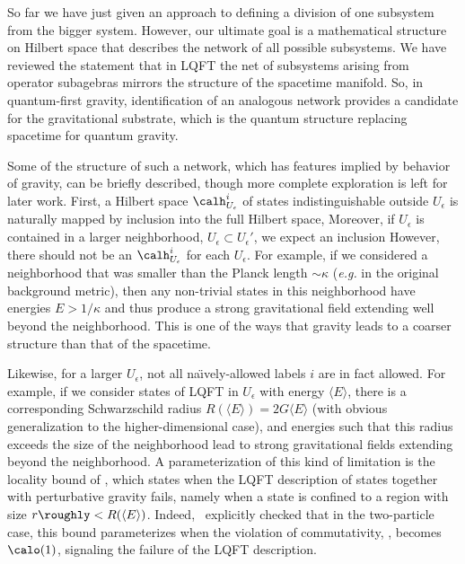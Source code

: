 So far we have just given an approach to defining a division of one subsystem from the bigger system.  However, our ultimate goal is a mathematical structure on Hilbert space that describes the network of all possible subsystems.  We have reviewed the statement that in LQFT the net of subsystems arising from operator subagebras mirrors the structure of the spacetime manifold. So, in quantum-first gravity, identification of an analogous network provides a candidate for the gravitational substrate, which is the quantum structure replacing spacetime for quantum gravity.

Some of the structure of such a network, which has features implied by behavior of gravity, can be briefly described, though more complete exploration is left for later work.  First, a Hilbert space $\calh^i_{U_\epsilon}$ of states indistinguishable outside $U_\epsilon$ is naturally mapped by inclusion into the full Hilbert space,
%
\eqn{}
%
Moreover, if $U_\epsilon$ is contained in a larger neighborhood, $U_\epsilon \subset U_\epsilon'$, we expect an inclusion
%
\eqn{}
%
However, there should not be an $\calh^i_{U_\epsilon}$ for each $U_\epsilon$.  For example, if we considered a neighborhood that was smaller than the Planck length $\sim \kappa$ ({\it e.g.} in the original background metric), then any non-trivial states in this neighborhood have energies $E>1/\kappa$ and thus produce a strong gravitational field extending well beyond the neighborhood.  This is one of the ways that gravity leads to a coarser structure than that of the spacetime.

Likewise, for a larger $U_\epsilon$, not all na\"\i vely-allowed labels $i$ are in fact allowed.  For example, if we consider states of LQFT in $U_\epsilon$ with energy $\langle E\rangle$, there is a corresponding Schwarzschild radius $R(\langle E\rangle)=2G\langle E\rangle$ (with obvious generalization to the higher-dimensional case), and energies such that this radius exceeds the size of the neighborhood lead to strong gravitational fields extending beyond the neighborhood.    A parameterization of this kind of limitation is the locality bound of , which states when the LQFT description of states together with perturbative gravity fails, namely when a state is confined to a region with size $r\roughly<R(\langle E\rangle)$.  Indeed, \DoGione\ explicitly checked that in the two-particle case, this bound parameterizes when the violation of commutativity, \phicom, becomes $\calo(1)$, signaling the failure of the LQFT description. 

